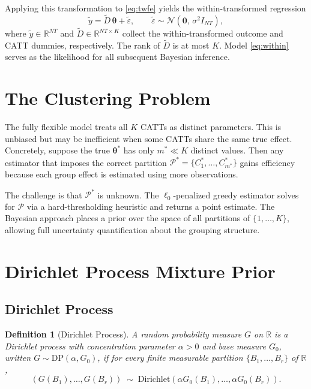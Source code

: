 \documentclass[12pt]{article}
\newtheorem{definition}{Definition}
\newcommand{\DP}{\mathrm{DP}}
\newcommand{\Normal}{\mathcal{N}}
\newcommand{\R}{\mathbb{R}}
\newcommand{\1}{\mathbbm{1}}
\newcommand{\ytd}{\tilde{y}}
\newcommand{\Dtd}{\tilde{D}}
\newcommand{\epstd}{\tilde{\varepsilon}}
\begin{document}
Applying this transformation to \eqref{eq:twfe} yields the within-transformed
regression
\begin{equation}
  \ytd = \Dtd\,\bm{\theta} + \epstd, \qquad \epstd\sim\Normal(\bm{0},\,\sigma^2 I_{NT}),
  \label{eq:within}
\end{equation}
where $\ytd\in\R^{NT}$ and $\Dtd\in\R^{NT\times K}$ collect the
within-transformed outcome and CATT dummies, respectively. The rank of $\Dtd$
is at most $K$. Model \eqref{eq:within} serves as the likelihood for all
subsequent Bayesian inference.

\section{The Clustering Problem}

The fully flexible model treats all $K$ CATTs as distinct parameters. This is
unbiased but may be inefficient when some CATTs share the same true effect.
Concretely, suppose the true $\bm{\theta}^*$ has only $m^* \ll K$ distinct
values. Then any estimator that imposes the correct partition
$\mathcal{P}^* = \{C_1^*,\ldots,C_{m^*}^*\}$ gains efficiency because each
group effect is estimated using more observations.

The challenge is that $\mathcal{P}^*$ is unknown. The $\ell_0$-penalized greedy
estimator solves for $\mathcal{P}$ via a hard-thresholding heuristic and
returns a point estimate. The Bayesian approach places a prior over the space
of all partitions of $\{1,\ldots,K\}$, allowing full uncertainty quantification
about the grouping structure.

\section{Dirichlet Process Mixture Prior}

\subsection{Dirichlet Process}

\begin{definition}[Dirichlet Process]
  A random probability measure $G$ on $\R$ is a Dirichlet process with
  concentration parameter $\alpha > 0$ and base measure $G_0$, written
  $G\sim\DP(\alpha, G_0)$, if for every finite measurable partition
  $\{B_1,\ldots,B_r\}$ of $\R$,
  \begin{equation}
    (G(B_1),\ldots,G(B_r)) \;\sim\; \mathrm{Dirichlet}(\alpha G_0(B_1),\ldots,\alpha G_0(B_r)).
  \end{equation}
\end{definition}
\end{document}
